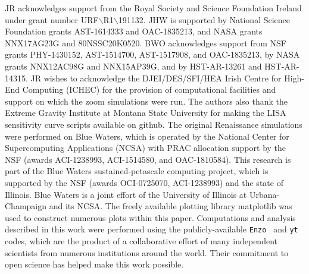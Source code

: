\documentclass[twocolumn,iop,revtex4]{openjournal}
\newcommand{\enzo}{\texttt{Enzo~}}
\newcommand{\yt}{\texttt{yt~}}
\begin{document}
\noindent JR acknowledges support from the Royal Society and Science Foundation Ireland under
grant number URF$\backslash$R1$\backslash$191132.
JHW is supported by National Science Foundation grants AST-1614333 and
OAC-1835213, and NASA grants NNX17AG23G and 80NSSC20K0520.  
BWO acknowledges support from NSF grants PHY-1430152, AST-1514700, AST-1517908, and  OAC-1835213, by NASA grants NNX12AC98G and NNX15AP39G, and by HST-AR-13261 and HST-AR-14315.
JR wishes to acknowledge the DJEI/DES/SFI/HEA Irish Centre for High-End Computing (ICHEC) for the
provision of computational facilities and support on which the zoom simulations were run.
The authors also thank the Extreme Gravity Institute at Montana State University for making the
LISA sensitivity curve scripts available on github. 
The original Renaissance simulations were performed on Blue 
Waters, which is operated by the National Center for Supercomputing Applications (NCSA)
with PRAC allocation support by the NSF (awards ACI-1238993, ACI-1514580, and OAC-1810584).
This research is part of the Blue Waters sustained-petascale computing project, which
is supported by the NSF (awards OCI-0725070, ACI-1238993) and the state of
Illinois. Blue Waters is a joint effort of the University of Illinois at
Urbana-Champaign and its NCSA.  The freely available plotting library {\sc
matplotlib} \citep{matplotlib} was used to construct numerous plots within this
paper. Computations and analysis described in this work were performed using the
publicly-available \enzo{}\citep{Enzo_2014, Enzo_2019} and \yt{} \citep{YT} codes,
which are the product of a collaborative effort of many independent scientists
from numerous institutions around the world. Their commitment to open science
has helped make this work possible.


\label{lastpage}


\end{document}

